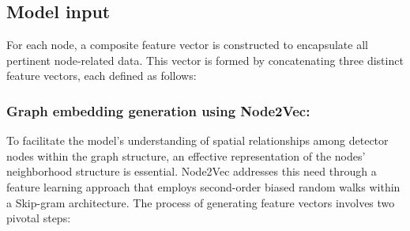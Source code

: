 \subsection{\textbf{Model input}}

For each node, a composite feature vector is constructed to encapsulate all pertinent node-related data. This vector is formed by concatenating three distinct feature vectors, each defined as follows:

\subsubsection{Graph embedding generation using Node2Vec:}\label{subsubsec:embd}

To facilitate the model's understanding of spatial relationships among detector nodes within the graph structure, an effective representation of the nodes' neighborhood structure is essential. Node2Vec \cite{node2vec} addresses this need through a feature learning approach that employs second-order biased random walks within a Skip-gram architecture. The process of generating feature vectors involves two pivotal steps:


